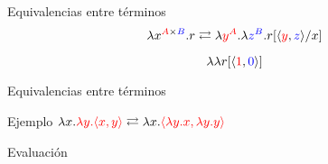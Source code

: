 \begin{frame}{Equivalencias entre términos}	
	\[ \lambda x^{\textcolor{red}{A} \times \textcolor{blue}{B}}. r \rightleftarrows \lambda \textcolor{red}{y^A}. \lambda \textcolor{blue}{z^B}. r[\langle \textcolor{red}{y}, \textcolor{blue}{z} \rangle/x] \]

	\pause
	\[ \lambda \lambda r[\langle \textcolor{red}{1},\textcolor{blue}{0} \rangle] \]
	
	\pause
	
	\pause
	
\end{frame}

\begin{frame}{Equivalencias entre términos}	
\end{frame}

\begin{frame}{Ejemplo}
	$ \lambda x. \textcolor{red}{\lambda y. \langle x, y \rangle} \rightleftarrows \lambda x. \textcolor{red}{\langle \lambda y.x, \lambda y.y \rangle} $
\end{frame}

\iffalse
\begin{frame}{Evaluación}
\end{frame}

